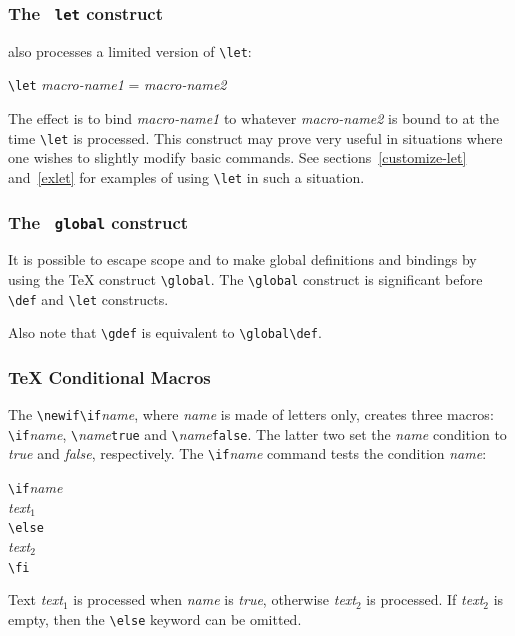 \subsubsection{The \texttt{ let} construct}
\hevea{} also processes a
limited version of \verb+\let+:
\begin{flushleft}
\verb+\let+ {\it macro-name1} = {\it macro-name2}
\end{flushleft}
The effect is to bind  {\it macro-name1} to whatever {\it macro-name2}
is bound to at the time \verb+\let+ is processed. This construct may
prove very useful in situations where
one wishes to slightly modify basic commands.
See sections~\ref{customize-let} and~\ref{exlet} for examples of using
\verb+\let+ in such a situation.




\subsubsection{The \texttt{ global} construct}
It is possible to escape scope and to make global definitions
and bindings by using the \TeX{} construct \verb+\global+.
The \verb+\global+ construct is significant before
\verb+\def+ and \verb+\let+ constructs.

Also note that \verb+\gdef+ is equivalent to \verb+\global\def+.


\subsubsection{\TeX{} Conditional Macros}\label{texcond}
The \verb+\newif\if+\textit{name}, where \textit{name} is made of letters
only, creates three macros:
\verb+\if+\textit{name}, \verb+\+\textit{name}\verb+true+ and
\verb+\+\textit{name}\verb+false+.
The latter two set the \textit{name} condition to \textit{true} and
\textit{false}, respectively.
The \verb+\if+\textit{name} command tests the condition \textit{name}:
\begin{flushleft}
\verb+\if+\textit{name}\\
\textit{text$_1$}\\
\verb+\else+\\
\textit{text$_2$}\\
\verb+\fi+\\
\end{flushleft}
Text \textit{text$_1$} is processed when \textit{name} is
\textit{true}, otherwise \textit{text$_2$} is processed.
If \textit{text$_2$}  is empty, then the \verb+\else+ keyword can be
omitted.

